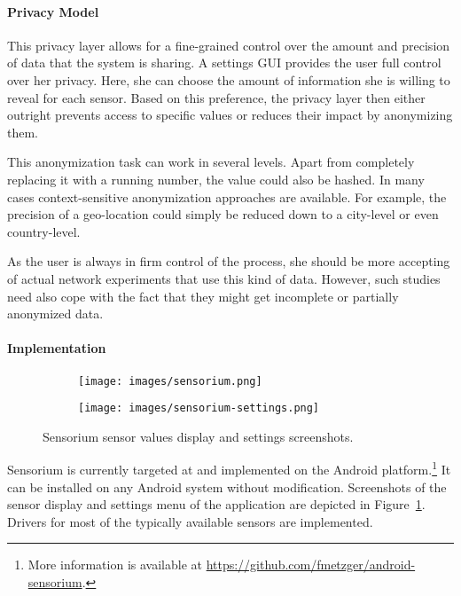 \paragraph{Privacy Model}

This privacy layer allows for a fine-grained control over the amount and precision of data that the system is sharing. A settings \acrshort{GUI} provides the user full control over her privacy. Here, she can choose the amount of information she is willing to reveal for each sensor. Based on this preference, the privacy layer then either outright prevents access to specific values or reduces their impact by anonymizing them.

This anonymization task can work in several levels. Apart from completely replacing it with a running number, the value could also be hashed. In many cases context-sensitive anonymization approaches are available. For example, the precision of a geo-location could simply be reduced down to a city-level or even country-level.

As the user is always in firm control of the process, she should be more accepting of actual network experiments that use this kind of data. However, such studies need also cope with the fact that they might get incomplete or partially anonymized data.


\paragraph{Implementation}

\begin{figure}[htb]
	\centering
	\begin{subfigure}[b]{0.45\textwidth}
		\texttt{[image: images/sensorium.png]}
	\end{subfigure}%
	\hfill
	\begin{subfigure}[b]{0.45\textwidth}
		\texttt{[image: images/sensorium-settings.png]}
	\end{subfigure}%
	\caption{Sensorium sensor values display and settings screenshots.}
\label{c5:fig:sensorium}
\end{figure}

Sensorium is currently targeted at and implemented on the Android platform.\footnote{More information is available at \url{https://github.com/fmetzger/android-sensorium}.} It can be installed on any Android system without modification. Screenshots of the sensor display and settings menu of the application are depicted in Figure~\ref{c5:fig:sensorium}. Drivers for most of the typically available sensors are implemented.

